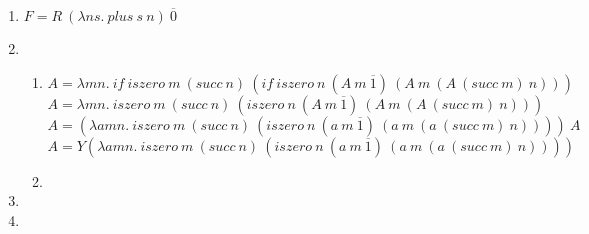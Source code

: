 \begin{enumerate}
\begin{enumerate}
        
    \end{enumerate}
  
  \item
    $ F = R~(\lambda ns.~plus~s~n)~\overline{0} $
  
  \item
    \begin{enumerate}
      \item
          $ A = \lambda mn.~if~iszero~m~(succ~n)~(if~iszero~n~(A~m~\overline{1})~(A~m~(A~(succ~m)~n))) $\\
          $ A = \lambda mn.~iszero~m~(succ~n)~(iszero~n~(A~m~\overline{1})~(A~m~(A~(succ~m)~n)))  $\\
          $ A = (\lambda amn.~iszero~m~(succ~n)~(iszero~n~(a~m~\overline{1})~(a~m~(a~(succ~m)~n))))~A $\\
          $ A = Y(\lambda amn.~iszero~m~(succ~n)~(iszero~n~(a~m~\overline{1})~(a~m~(a~(succ~m)~n)))) $
              
      
      \item
    \end{enumerate}
  
  \item
  
  \item
\end{enumerate}